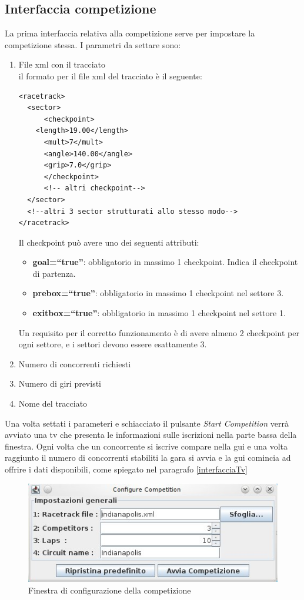 \subsection{Interfaccia competizione}
La prima interfaccia relativa alla competizione serve per impostare la competizione stessa. I parametri da settare sono:
\begin{enumerate}
\item File xml con il tracciato\\
il formato per il file xml del tracciato \`{e} il seguente:
\begin{lstlisting}
<racetrack>
  <sector>
      <checkpoint>
	<length>19.00</length>
	  <mult>7</mult>
	  <angle>140.00</angle>
	  <grip>7.0</grip>
      </checkpoint>
      <!-- altri checkpoint-->
  </sector>
  <!--altri 3 sector strutturati allo stesso modo-->
</racetrack>
\end{lstlisting}
Il checkpoint pu\`{o} avere uno dei seguenti attributi:
\begin{itemize}
\item \textbf{goal=``true''}: obbligatorio in massimo 1 checkpoint. Indica il checkpoint di partenza.
\item \textbf{prebox=``true''}: obbligatorio in massimo 1 checkpoint nel settore 3.
\item \textbf{exitbox=``true''}: obbligatorio in massimo 1 checkpoint nel settore 1.
\end{itemize}
Un requisito per il corretto funzionamento è di avere almeno 2 checkpoint per ogni settore, e i settori devono essere esattamente 3.
\item Numero di concorrenti richiesti
\item Numero di giri previsti
\item Nome del tracciato
\end{enumerate}
Una volta settati i parameteri e schiacciato il pulsante \emph{Start Competition} verr\`{a} avviato una tv che presenta le informazioni sulle iscrizioni nella parte bassa della finestra. Ogni volta che un concorrente si iscrive compare nella gui e una volta raggiunto il numero di concorrenti stabiliti la gara si avvia e la gui comincia ad offrire i dati disponibili, come spiegato nel paragrafo \ref{interfacciaTv}
\begin{center}
\begin{figure}[H]
	\includegraphics[scale=0.75]{screenshotRelazione/competition.jpeg}
	\caption{Finestra di configurazione della competizione}
\end{figure}
\end{center}
